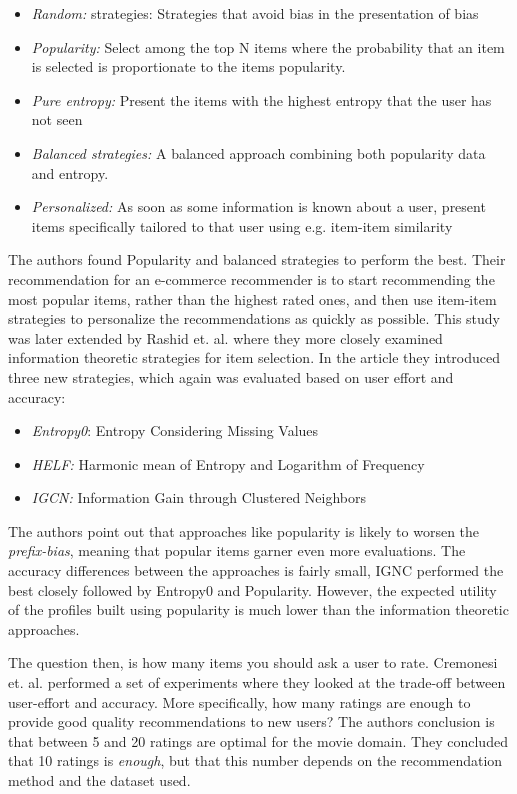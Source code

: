 \begin{itemize}
\item \emph{Random:} strategies: Strategies that avoid bias in the presentation
of bias
\item \emph{Popularity:} Select among the top N items where the probability
that an item is selected is proportionate to the items popularity.
\item \emph{Pure entropy:} Present the items with the highest entropy that the
user has not seen
\item \emph{Balanced strategies:} A balanced approach combining both popularity
data and entropy.
\item \emph{Personalized:} As soon as some information is known about a user,
present items specifically tailored to that user using e.g. item-item
similarity
\end{itemize}

The authors found Popularity and balanced strategies to perform the best. Their recommendation for an e-commerce recommender is to start recommending the most popular items, rather than the highest rated ones, and then use item-item strategies to personalize the recommendations as quickly as possible. This study was later extended by Rashid et. al. \cite{Rashid2008} where they
more closely examined information theoretic strategies for item selection. In the article they introduced three new strategies, which again was evaluated based on user effort and accuracy:

\begin{itemize}
\item \emph{Entropy0}: Entropy Considering Missing Values
\item \emph{HELF:} Harmonic mean of Entropy and Logarithm of Frequency
\item \emph{IGCN:} Information Gain through Clustered Neighbors
\end{itemize}

The authors point out that approaches like popularity is likely to worsen the \emph{prefix-bias}, meaning that popular items garner even more evaluations. The accuracy differences between the approaches is fairly small, IGNC performed the best closely followed by Entropy0 and Popularity. However, the expected utility of the profiles built using popularity is much lower than the information theoretic approaches.\linebreak[4]

The question then, is how many items you should ask a user to rate. Cremonesi et. al. \cite{Cremonesi2012} performed a set of experiments where
they looked at the trade-off between user-effort and accuracy. More
specifically, how many ratings are enough to provide good quality
recommendations to new users? The authors conclusion is that between 5 and 20
ratings are optimal for the movie domain. They concluded that 10
ratings is \emph{enough}, but that this number depends on the recommendation method
and the dataset used.


